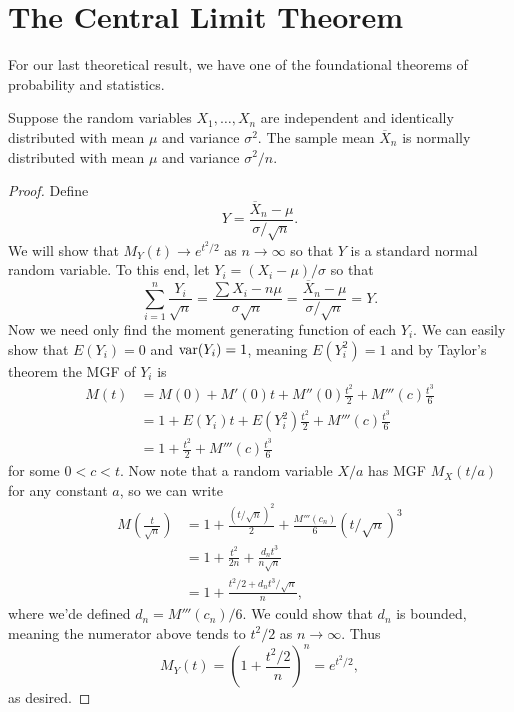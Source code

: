 \documentclass[../m157main.tex]{subfiles}
\begin{document}
\pagebreak

\section{The Central Limit Theorem}
For our last theoretical result, we have one of the foundational theorems of probability and statistics.

\begin{theorem}
    Suppose the random variables $X_1, \ldots, X_n$ are independent and identically distributed with mean $\mu$ and variance $\sigma^2$.
    The sample mean $\overline{X}_n$ is normally distributed with mean $\mu$ and variance $\sigma^2 / n$.
\end{theorem}

\begin{proof}
    Define
    \[ Y = \frac{\overline{X}_n - \mu}{\sigma / \sqrt{n}}. \]
    We will show that $M_Y(t) \to e^{t^2 / 2}$ as $n \to \infty$ so that $Y$ is a standard normal random variable.
    To this end, let $Y_i = (X_i - \mu) / \sigma$ so that
    \[ \sum_{i=1}^{n} \frac{Y_i}{\sqrt{n}} = \frac{\sum X_i - n\mu}{\sigma \sqrt{n}} = \frac{\overline{X}_n - \mu}{\sigma / \sqrt{n}} = Y. \]
    Now we need only find the moment generating function of each $Y_i$.
    We can easily show that $E(Y_i) = 0$ and $\operatorname{var}(Y_i) = 1$, meaning $E(Y_i^2) = 1$ and by Taylor's theorem the MGF of $Y_i$ is
    \begin{align*}
        M(t) &= M(0) + M'(0) t + M''(0) \frac{t^2}{2} + M'''(c) \frac{t^3}{6} \\
        &= 1 + E(Y_i) t + E(Y_i^2) \frac{t^2}{2} + M'''(c) \frac{t^3}{6} \\
        &= 1 + \frac{t^2}{2} + M'''(c) \frac{t^3}{6}
    \end{align*}
    for some $0 < c < t$.
    Now note that a random variable $X / a$ has MGF $M_X(t / a)$ for any constant $a$, so we can write
    \begin{align*}
        M \left( \frac{t}{\sqrt{n}} \right) &= 1 + \frac{(t / \sqrt{n})^2}{2} + \frac{M'''(c_n)}{6} (t / \sqrt{n})^3 \\
        &= 1 + \frac{t^2}{2n} + \frac{d_n t^3}{n \sqrt{n}} \\
        &= 1 + \frac{t^2 / 2 + d_n t^3 / \sqrt{n}}{n},
    \end{align*}
    where we'de defined $d_n = M'''(c_n) / 6$.
    We could show that $d_n$ is bounded, meaning the numerator above tends to $t^2 / 2$ as $n \to \infty$.
    Thus
    \[ M_Y(t) = \left( 1 + \frac{t^2 / 2}{n} \right)^{n} = e^{t^2 / 2}, \]
    as desired.
\end{proof}
\end{document}
